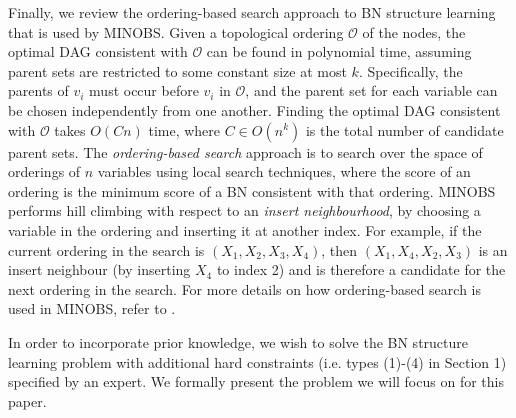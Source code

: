 \documentclass[twoside,11pt]{article}
\begin{document}
Finally, we review the ordering-based search \citep{TeyssierK05} approach to BN structure learning that is used by MINOBS. Given a topological ordering $\mathcal{O}$ of the nodes, the optimal DAG consistent with $\mathcal{O}$ can be found in polynomial time, assuming parent sets are restricted to some constant size at most $k$. Specifically, the parents of $v_i$ must occur before $v_i$ in $\mathcal{O}$, and the parent set for each variable can be chosen independently from one another. Finding the optimal DAG consistent with
 $\mathcal{O}$ takes $O(Cn)$ time, where $C \in O(n^k)$ is the total number of candidate parent sets. The \emph{ordering-based search} approach is to search over the 
 space of orderings of $n$ variables using local search techniques, where the score of an ordering is the minimum score of a BN consistent with that ordering. MINOBS performs
 hill climbing with respect to an \emph{insert neighbourhood}, by choosing a variable in the ordering and inserting it at another index. For example, if the current ordering in the search is
 $(X_1, X_2, X_3, X_4)$, then $(X_1, X_4, X_2, X_3)$ is an insert neighbour (by inserting $X_4$ to index 2) and is therefore a candidate for the next ordering in the search. 
 For more details on how ordering-based search is used in MINOBS, refer to \cite{Lee2017}.

\medskip 
In order to incorporate prior knowledge, we wish to solve the BN structure learning problem with additional hard constraints (i.e. types (1)-(4) in Section 1) specified by an expert. We formally present the problem we will focus on for this paper.
\end{document}
